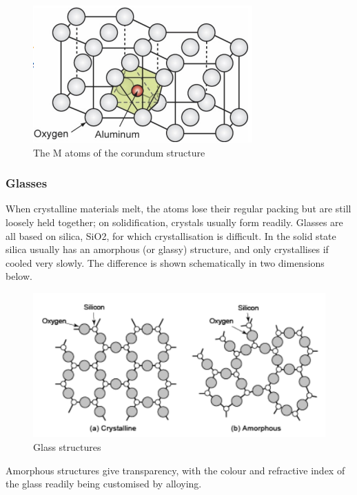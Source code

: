 \documentclass{article}
\begin{document}
\begin{figure}[h]
    \centering
    \includegraphics{images/mat11.png}
    \caption{The M atoms of the corundum structure}
    \label{fig:enter-label}
\end{figure}

\subsubsection{Glasses}

When crystalline materials melt, the atoms lose their regular packing but are still loosely held together; on solidification, crystals usually form readily. Glasses are all based on silica, SiO2, for which crystallisation is difficult. In the solid state silica usually has an amorphous (or glassy) structure, and only crystallises if cooled very slowly. The difference is shown schematically in two dimensions below.

\begin{figure}[h]
    \centering
    \includegraphics{images/mat12.png}
    \caption{Glass structures}
    \label{fig:enter-label}
\end{figure}

Amorphous structures give transparency, with the colour and refractive index of the glass readily
being customised by alloying.

\newpage
\end{document}
